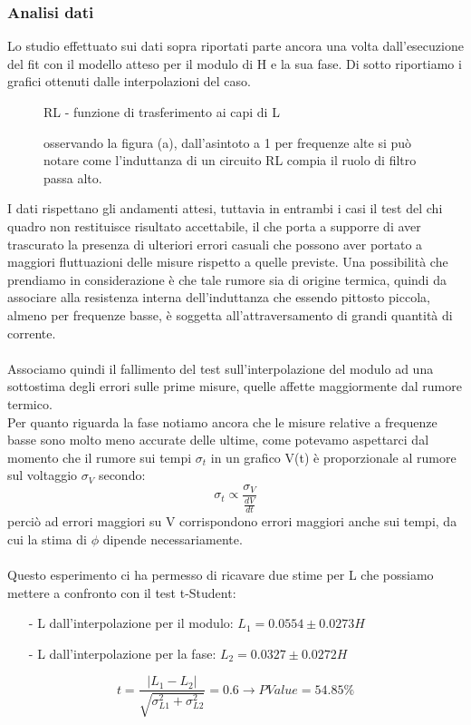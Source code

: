 \documentclass{article}
\theoremstyle{definition}
\begin{document}
\subsubsection*{Analisi dati}
Lo studio effettuato sui dati sopra riportati parte ancora una volta dall'esecuzione del fit con il modello atteso per il modulo di H e la sua fase. Di sotto riportiamo i grafici ottenuti dalle interpolazioni del caso. \\

\begin{figure}[!h]
\caption{RL - funzione di trasferimento ai capi di L}
\label{fig:RL_su_L}
\caption*{osservando la figura (a), dall'asintoto a 1 per frequenze alte si può notare come l'induttanza di un circuito RL compia il ruolo di filtro passa alto.}
\end{figure}

\noindent I dati rispettano gli andamenti attesi, tuttavia in entrambi i casi il test del chi quadro non restituisce risultato accettabile, il che porta a supporre di aver trascurato la presenza di ulteriori errori casuali che possono aver portato a maggiori fluttuazioni delle misure rispetto a quelle previste. Una possibilità che prendiamo in considerazione è che tale rumore sia di origine termica, quindi da associare alla resistenza interna dell'induttanza che essendo pittosto piccola, almeno per frequenze basse, è soggetta all'attraversamento di grandi quantità di corrente. \\\\
Associamo quindi il fallimento del test sull'interpolazione del modulo ad una sottostima degli errori sulle prime misure, quelle affette maggiormente dal rumore termico. \\
Per quanto riguarda la fase notiamo ancora che le misure relative a frequenze basse sono molto meno accurate delle ultime, come potevamo aspettarci dal momento che il rumore sui tempi  \(\sigma_{t}\) in un grafico V(t) è proporzionale al rumore sul voltaggio \(\sigma_{V}\) secondo:
\[\sigma_{t} \propto \frac{\sigma_{V}}{\frac{dV}{dt}}\]
perciò ad errori maggiori su V corrispondono errori maggiori anche sui tempi, da cui la stima di \(\phi\) dipende necessariamente. \\\\
Questo esperimento ci ha permesso di ricavare due stime per L che possiamo mettere a confronto con il test t-Student: \\
\begin{enumerate}
    \item[-] L dall'interpolazione per il modulo: \(L_{1} = 0.0554 \pm 0.0273H\)
    \item[-] L dall'interpolazione per la fase: \(L_{2} = 0.0327 \pm 0.0272 H\)
\end{enumerate}
\[t = \frac{\left|L_{1} - L_{2}\right|}{\sqrt{\sigma^{2}_{L1} + \sigma^{2}_{L2}}} = 0.6 \rightarrow PValue = 54.85\%\]
\end{document}
